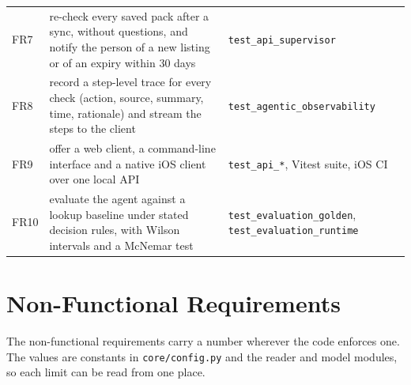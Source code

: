 \begin{table}[!htbp]
\begin{tabularx}{\linewidth}{@{}l >{\raggedright\arraybackslash}X >{\raggedright\arraybackslash}p{3.7cm}@{}}
FR7 & re-check every saved pack after a sync, without questions, and notify the person of a new listing or of an expiry within 30 days & \texttt{test\_api\_supervisor} \\
FR8 & record a step-level trace for every check (action, source, summary, time, rationale) and stream the steps to the client & \texttt{test\_agentic\_observability} \\
FR9 & offer a web client, a command-line interface and a native iOS client over one local API & \texttt{test\_api\_*}, Vitest suite, iOS CI \\
FR10 & evaluate the agent against a lookup baseline under stated decision rules, with Wilson intervals and a McNemar test & \texttt{test\_evaluation\_golden}, \texttt{test\_evaluation\_runtime} \\
\bottomrule
\end{tabularx}
\end{table}

\section{Non-Functional Requirements}
\label{sec:req-non-functional-requirements}

The non-functional requirements carry a number wherever the code enforces one. The values are
constants in \texttt{core/config.py} and the reader and model modules, so each limit can be
read from one place.

